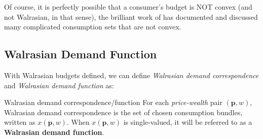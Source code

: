 Of course, it is perfectly possible that a consumer's budget is NOT convex (and not Walrasian, in that sense), the brilliant work of \citet{deaton1980economics} has documented and discussed many complicated consumption sets that are not convex.

\subsection{Walrasian Demand Function}\label{chap2:sec2:ssec2}
With Walrasian budgets defined, we can define \textit{Walrasian demand correspondence} and \textit{Walrasian demand function} as:
\begin{definition}{Walrasian demand correspondence/function}{}
    For each \textit{price-wealth} pair $(\mathbf{p},w)$, Walrasian demand correspondence is the set of chosen consumption bundles, written as $ x(\mathbf{p},w)$. When $ x(\mathbf{p},w)$ is single-valued, it will be referred to as a \textbf{Walrasian demand function}.
\end{definition}

